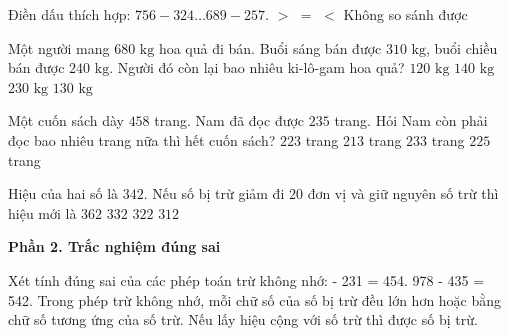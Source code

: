 \begin{ex} %
Điền dấu thích hợp: $756 - 324 \dots 689 - 257$.
\choice
{$>$}
{\True $=$}
{$<$}
{Không so sánh được}
\end{ex}

\begin{ex} %
Một người mang $680\text{ kg}$ hoa quả đi bán. Buổi sáng bán được $310\text{ kg}$, buổi chiều bán được $240\text{ kg}$. Người đó còn lại bao nhiêu ki-lô-gam hoa quả?
\choice
{$120\text{ kg}$}
{$140\text{ kg}$}
{$230\text{ kg}$}
{\True $130\text{ kg}$}
\end{ex}

\begin{ex} %
Một cuốn sách dày $458$ trang. Nam đã đọc được $235$ trang. Hỏi Nam còn phải đọc bao nhiêu trang nữa thì hết cuốn sách?
\choice
{\True $223$ trang}
{$213$ trang}
{$233$ trang}
{$225$ trang}
\end{ex}

\begin{ex} %
Hiệu của hai số là $342$. Nếu số bị trừ giảm đi $20$ đơn vị và giữ nguyên số trừ thì hiệu mới là
\choice
{$362$}
{$332$}
{\True $322$}
{$312$}
\end{ex}

\textbf{Phần 2. Trắc nghiệm đúng sai}

\begin{ex} %
Xét tính đúng sai của các phép toán trừ không nhớ:
\choiceTF
{ - 231 = 454.}
{978 - 435 = 542.}
{\True Trong phép trừ không nhớ, mỗi chữ số của số bị trừ đều lớn hơn hoặc bằng chữ số tương ứng của số trừ.}
{\True Nếu lấy hiệu cộng với số trừ thì được số bị trừ.}
\end{ex}

